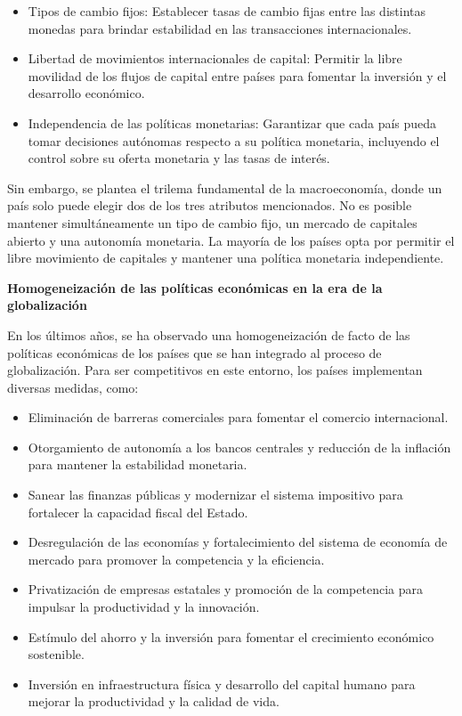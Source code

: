 \documentclass[
  jou,
  floatsintext,
  longtable,
  a4paper,
  nolmodern,
  notxfonts,
  notimes,
  12pt,
  colorlinks=true,linkcolor=blue,citecolor=blue,urlcolor=blue]{apa7}
\begin{document}
\begin{itemize}
\item
  Tipos de cambio fijos: Establecer tasas de cambio fijas entre las
  distintas monedas para brindar estabilidad en las transacciones
  internacionales.
\item
  Libertad de movimientos internacionales de capital: Permitir la libre
  movilidad de los flujos de capital entre países para fomentar la
  inversión y el desarrollo económico.
\item
  Independencia de las políticas monetarias: Garantizar que cada país
  pueda tomar decisiones autónomas respecto a su política monetaria,
  incluyendo el control sobre su oferta monetaria y las tasas de
  interés.
\end{itemize}

Sin embargo, se plantea el trilema fundamental de la macroeconomía,
donde un país solo puede elegir dos de los tres atributos mencionados.
No es posible mantener simultáneamente un tipo de cambio fijo, un
mercado de capitales abierto y una autonomía monetaria. La mayoría de
los países opta por permitir el libre movimiento de capitales y mantener
una política monetaria independiente.

\textbf{Homogeneización de las políticas económicas en la era de la
globalización}

En los últimos años, se ha observado una homogeneización de facto de las
políticas económicas de los países que se han integrado al proceso de
globalización. Para ser competitivos en este entorno, los países
implementan diversas medidas, como:

\begin{itemize}
\item
  Eliminación de barreras comerciales para fomentar el comercio
  internacional.
\item
  Otorgamiento de autonomía a los bancos centrales y reducción de la
  inflación para mantener la estabilidad monetaria.
\item
  Sanear las finanzas públicas y modernizar el sistema impositivo para
  fortalecer la capacidad fiscal del Estado.
\item
  Desregulación de las economías y fortalecimiento del sistema de
  economía de mercado para promover la competencia y la eficiencia.
\item
  Privatización de empresas estatales y promoción de la competencia para
  impulsar la productividad y la innovación.
\item
  Estímulo del ahorro y la inversión para fomentar el crecimiento
  económico sostenible.
\item
  Inversión en infraestructura física y desarrollo del capital humano
  para mejorar la productividad y la calidad de vida.
\end{itemize}
\end{document}
